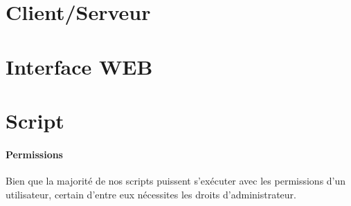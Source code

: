 \documentclass[11pt,a4paper,titlepage, oneside]{article}
\begin{document}
		
\newpage
\section{{\color{red} Client/Serveur}}

\newpage
\section{{\color{red} Interface WEB}}

\newpage
\section{{\color{red} Script }}
	\paragraph{Permissions}
		Bien que la majorité de nos scripts puissent s'exécuter avec les permissions d'un utilisateur, certain d'entre eux nécessites les droits d'administrateur.\\
\end{document}
